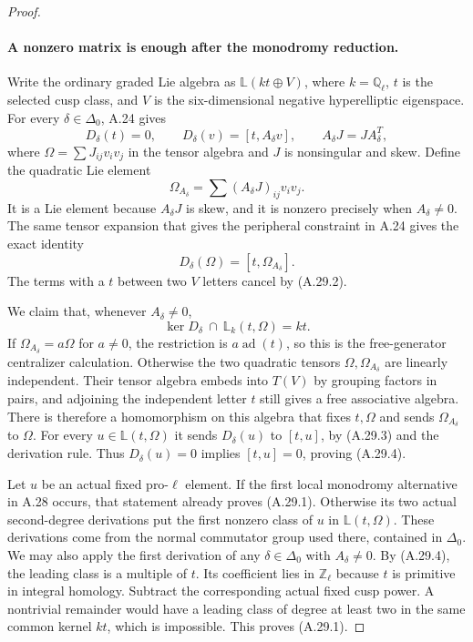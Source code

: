 \begin{proof}
\paragraph{A nonzero matrix is enough after the monodromy reduction.}
Write the ordinary graded Lie algebra as
$\mathbb L(kt\oplus V)$, where $k=\mathbb Q_\ell$,
$t$ is the selected cusp class, and $V$ is the
six-dimensional negative hyperelliptic eigenspace.
For every $\delta\in\Delta_0$, A.24 gives
\[
 D_\delta(t)=0,\qquad
 D_\delta(v)=[t,A_\delta v],\qquad
                  A_\delta J=JA_\delta^T,
                                                        \tag{A.29.2}
\]
where $\Omega=\sum J_{ij}v_iv_j$ in the tensor algebra
and $J$ is nonsingular and skew. Define the quadratic
Lie element
\[
                     \Omega_{A_\delta}
                              =\sum(A_\delta J)_{ij}v_iv_j.
\]
It is a Lie element because $A_\delta J$ is skew, and
it is nonzero precisely when $A_\delta\ne0$.
The same tensor expansion that gives the peripheral
constraint in A.24 gives the exact identity
\[
                   D_\delta(\Omega)
                             =[t,\Omega_{A_\delta}].
                                                        \tag{A.29.3}
\]
The terms with a $t$ between two $V$ letters cancel
by (A.29.2).

We claim that, whenever $A_\delta\ne0$,
\[
 \ker D_\delta\ \cap\ \mathbb L_k(t,\Omega)=kt.
                                                        \tag{A.29.4}
\]
If $\Omega_{A_\delta}=a\Omega$ for $a\ne0$, the
restriction is $a\operatorname{ad}(t)$, so this is
the free-generator centralizer calculation. Otherwise
the two quadratic tensors $\Omega,\Omega_{A_\delta}$
are linearly independent. Their tensor algebra
embeds into $T(V)$ by grouping factors in pairs,
and adjoining the independent letter $t$ still
gives a free associative algebra. There is therefore
a homomorphism on this algebra that fixes $t,\Omega$
and sends $\Omega_{A_\delta}$ to $\Omega$.
For every $u\in\mathbb L(t,\Omega)$ it sends
$D_\delta(u)$ to $[t,u]$, by (A.29.3) and the
derivation rule. Thus $D_\delta(u)=0$ implies
$[t,u]=0$, proving (A.29.4).

Let $u$ be an actual fixed pro-$\ell$ element.
If the first local monodromy alternative in A.28
occurs, that statement already proves (A.29.1).
Otherwise its two actual second-degree derivations
put the first nonzero class of $u$ in
$\mathbb L(t,\Omega)$. These derivations come from
the normal commutator group used there, contained
in $\Delta_0$. We may also apply the first
derivation of any $\delta\in\Delta_0$ with
$A_\delta\ne0$. By (A.29.4), the leading class
is a multiple of $t$. Its coefficient lies in
$\mathbb Z_\ell$ because $t$ is primitive in
integral homology. Subtract the corresponding
actual fixed cusp power. A nontrivial remainder
would have a leading class of degree at least
two in the same common kernel $kt$, which is
impossible. This proves (A.29.1).


\end{proof}
